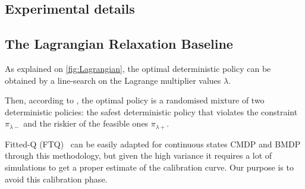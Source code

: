 \begin{subappendices}

%

\section{Experimental details}
\label{sec:exp-supp}

\subsection{The Lagrangian Relaxation Baseline}
\label{sec:lagragian}
As explained on \autoref{fig:Lagrangian}, the optimal deterministic policy can be obtained by a line-search on the Lagrange multiplier values $\lambda$.

Then, according to \citet[Theorem 4.4]{BEUTLER1985236}, the optimal policy is a randomised mixture of two deterministic policies: the safest deterministic policy that violates the constraint $\pi_{\lambda-}$ and the riskier of the feasible ones $\pi_{\lambda+}$.

Fitted-Q (FTQ)~\citep{Ernst2005,Riedmiller2005} can be easily adapted for continuous states CMDP and BMDP through this methodology, but given the high variance it requires a lot of simulations to get a proper estimate of the calibration curve. Our purpose is to avoid this calibration phase.


\end{subappendices}
